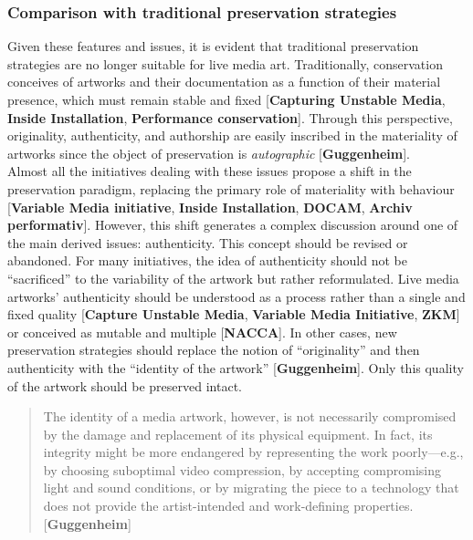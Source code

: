 \subsubsection{Comparison with traditional preservation strategies}
Given these features and issues, it is evident that traditional preservation strategies are no longer suitable for live media art. Traditionally, conservation conceives of artworks and their documentation as a function of their material presence, which must remain stable and fixed [\textbf{Capturing Unstable Media},\textbf{ Inside Installation}, \textbf{Performance conservation}]. Through this perspective, originality, authenticity, and authorship are easily inscribed in the materiality of artworks since the object of preservation is \textit{autographic} [\textbf{Guggenheim}].\\
Almost all the initiatives dealing with these issues propose a shift in the preservation paradigm, replacing the primary role of materiality with behaviour [\textbf{Variable Media initiative}, \textbf{Inside Installation}, \textbf{DOCAM}, \textbf{Archiv performativ}]. However, this shift generates a complex discussion around one of the main derived issues: authenticity. This concept should be revised or abandoned. For many initiatives, the idea of authenticity should not be ``sacrificed'' to the variability of the artwork but rather reformulated. Live media artworks’ authenticity should be understood as a process rather than a single and fixed quality [\textbf{Capture Unstable Media}, \textbf{Variable Media Initiative}, \textbf{ZKM}] or conceived as mutable and multiple \cite{castriota2018centres}[\textbf{NACCA}]. In other cases, new preservation strategies should replace the notion of ``originality'' and then authenticity with the ``identity of the artwork'' [\textbf{Guggenheim}]. Only this quality of the artwork should be preserved intact. 

\begin{quote}
The identity of a media artwork, however, is not necessarily compromised by the damage and replacement of its physical equipment. In fact, its integrity might be more endangered by representing the work poorly—e.g., by choosing suboptimal video compression, by accepting compromising light and sound conditions, or by migrating the piece to a technology that does not provide the artist-intended and work-defining properties. 
[\textbf{Guggenheim}]
\end{quote}

